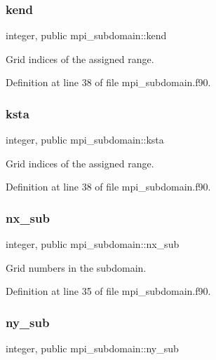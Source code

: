 \subsubsection{\texorpdfstring{kend}{kend}}
{\footnotesize\ttfamily integer, public mpi\+\_\+subdomain\+::kend}



Grid indices of the assigned range. 



Definition at line 38 of file mpi\+\_\+subdomain.\+f90.

\mbox{\label{namespacempi__subdomain_acd499eb1d07159aa9f5c878f9519b00f}} 
\subsubsection{\texorpdfstring{ksta}{ksta}}
{\footnotesize\ttfamily integer, public mpi\+\_\+subdomain\+::ksta}



Grid indices of the assigned range. 



Definition at line 38 of file mpi\+\_\+subdomain.\+f90.

\mbox{\label{namespacempi__subdomain_a005fe127fe0fc85b932814a820a36444}} 
\subsubsection{\texorpdfstring{nx\_sub}{nx\_sub}}
{\footnotesize\ttfamily integer, public mpi\+\_\+subdomain\+::nx\+\_\+sub}



Grid numbers in the subdomain. 



Definition at line 35 of file mpi\+\_\+subdomain.\+f90.

\mbox{\label{namespacempi__subdomain_a665ba05d0ae9309dd28b9b513a0c87a1}} 
\subsubsection{\texorpdfstring{ny\_sub}{ny\_sub}}
{\footnotesize\ttfamily integer, public mpi\+\_\+subdomain\+::ny\+\_\+sub}



